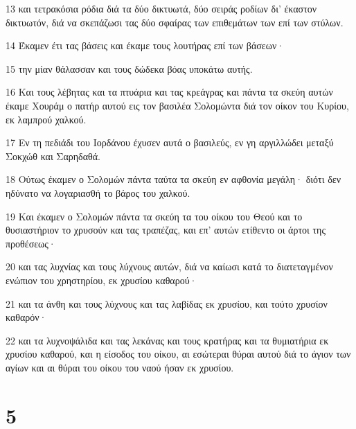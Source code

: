 \par 13 και τετρακόσια ρόδια διά τα δύο δικτυωτά, δύο σειράς ροδίων δι' έκαστον δικτυωτόν, διά να σκεπάζωσι τας δύο σφαίρας των επιθεμάτων των επί των στύλων.
\par 14 Έκαμεν έτι τας βάσεις και έκαμε τους λουτήρας επί των βάσεων·
\par 15 την μίαν θάλασσαν και τους δώδεκα βόας υποκάτω αυτής.
\par 16 Και τους λέβητας και τα πτυάρια και τας κρεάγρας και πάντα τα σκεύη αυτών έκαμε Χουράμ ο πατήρ αυτού εις τον βασιλέα Σολομώντα διά τον οίκον του Κυρίου, εκ λαμπρού χαλκού.
\par 17 Εν τη πεδιάδι του Ιορδάνου έχυσεν αυτά ο βασιλεύς, εν γη αργιλλώδει μεταξύ Σοκχώθ και Σαρηδαθά.
\par 18 Ούτως έκαμεν ο Σολομών πάντα ταύτα τα σκεύη εν αφθονία μεγάλη· διότι δεν ηδύνατο να λογαριασθή το βάρος του χαλκού.
\par 19 Και έκαμεν ο Σολομών πάντα τα σκεύη τα του οίκου του Θεού και το θυσιαστήριον το χρυσούν και τας τραπέζας, και επ' αυτών ετίθεντο οι άρτοι της προθέσεως·
\par 20 και τας λυχνίας και τους λύχνους αυτών, διά να καίωσι κατά το διατεταγμένον ενώπιον του χρηστηρίου, εκ χρυσίου καθαρού·
\par 21 και τα άνθη και τους λύχνους και τας λαβίδας εκ χρυσίου, και τούτο χρυσίον καθαρόν·
\par 22 και τα λυχνοψάλιδα και τας λεκάνας και τους κρατήρας και τα θυμιατήρια εκ χρυσίου καθαρού, και η είσοδος του οίκου, αι εσώτεραι θύραι αυτού διά το άγιον των αγίων και αι θύραι του οίκου του ναού ήσαν εκ χρυσίου.

\chapter{5}

